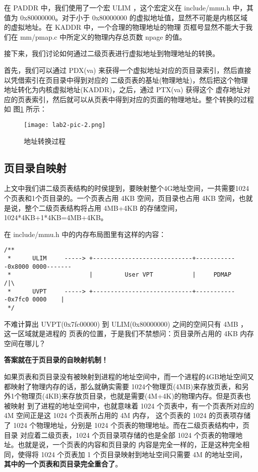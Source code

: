 在 PADDR 中，我们使用了一个宏 ULIM ，这个宏定义在 include/mmu.h 中，其值为 0x80000000。对于小于
 0x80000000 的虚拟地址值，显然不可能是内核区域的虚拟地址。在 KADDR 中，一个合理的物理地址的物理
页框号显然不能大于我们在 mm/pmap.c 中所定义的物理内存总页数 npage 的值。

接下来，我们讨论如何通过二级页表进行虚拟地址到物理地址的转换。

首先，我们可以通过 PDX(va) 来获得一个虚拟地址对应的页目录索引，然后直接以凭借索引在页目录中得到对应的
二级页表的基址(物理地址)，然后把这个物理地址转化为内核虚拟地址(KADDR)，之后，通过 PTX(va) 获得这个
虚存地址对应的页表索引，然后就可以从页表中得到对应的页面的物理地址。整个转换的过程如 图\ref{lab2-pic-2.png} 
所示：

\begin{figure}[htbp]
  \centering
  \texttt{[image: lab2-pic-2.png]}
  \caption{地址转换过程}\label{lab2-pic-2.png}
\end{figure}

\subsection{页目录自映射}

上文中我们讲二级页表结构的时侯提到，要映射整个4G地址空间，一共需要1024个页表和1个页目录的。一个页表占用 4KB 
空间，页目录也占用 4KB 空间，也就是说，整个二级页表结构将占用 4MB+4KB 的存储空间，1024*4KB+1*4KB=4MB+4KB。

在 include/mmu.h 中的内存布局图里有这样的内容：

\begin{verbatim}
/**
 *      ULIM     -----> +----------------------------+------------0x8000 0000-------
 *                      |         User VPT           |     PDMAP                /|\
 *      UVPT     -----> +----------------------------+------------0x7fc0 0000    |
 */
\end{verbatim}

不难计算出 UVPT(0x7fc00000) 到 ULIM(0x80000000) 之间的空间只有 4MB ，这一区域就是进程的
页表的位置，于是我们不禁想问：页目录所占用的 4KB 内存空间在哪儿？

\textbf{答案就在于页目录的自映射机制！}

如果页表和页目录没有被映射到进程的地址空间中，而一个进程的4GB地址空间又都映射了物理内存的话，那么就确实需要
1024个物理页(4MB)来存放页表，和另外1个物理页(4KB)来存放页目录，也就是需要(4M+4K)的物理内存。但是页表也被映射
到了进程的地址空间中，也就意味着 1024 个页表中，有一个页表所对应的 4M 空间正是这 1024 个页表所占用的 4M 内存，
这个页表的 1024 的页表项存储了 1024 个物理地址，分别是 1024 个页表的物理地址。而在二级页表结构中，页目录
对应着二级页表，1024 个页目录项存储的也是全部 1024 个页表的物理地址。也就是说，一个页表的内容和页目录的
内容是完全一样的，正是这种完全相同，使得将 1024 个页表加 1 个页目录映射到地址空间只需要 4M 的地址空间，
\textbf{其中的一个页表和页目录完全重合了}。

